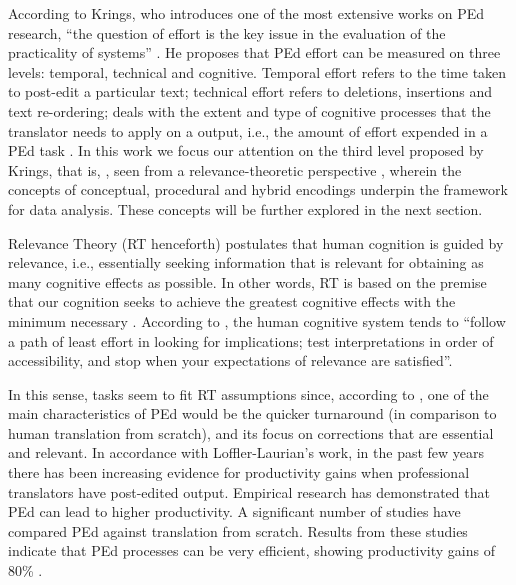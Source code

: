 \documentclass[output=paper]{langsci/langscibook}
\begin{document}
According to Krings, who introduces one of the most extensive works on PEd research, ``the question of  effort is the key issue in the evaluation of the practicality of  systems'' \citep[178]{krings2001}. He proposes that PEd effort can be measured on three levels: temporal, technical and cognitive. Temporal effort refers to the time taken to post-edit a particular text; technical effort refers to deletions, insertions and text re-ordering;  deals with the extent and type of cognitive processes that the translator needs to apply on a  output, i.e., the amount of effort expended in a PEd task \citep{obrien2006}. In this work we focus our attention on the third level proposed by Krings, that is, , seen from a relevance-theoretic perspective \citep{Sperber1986second}, wherein the concepts of conceptual, procedural and hybrid encodings underpin the framework for data analysis. These concepts will be further explored in the next section.



Relevance Theory (RT henceforth) postulates that human cognition is guided by relevance, i.e., essentially seeking information that is relevant for obtaining as many cognitive effects as possible. In other words, RT is based on the premise that our cognition seeks to achieve the greatest cognitive effects with the minimum necessary . According to \citet[72]{Wilson2011}, the human cognitive system tends to ``follow a path of least effort in looking for implications; test interpretations in order of accessibility, and stop when your expectations of relevance are satisfied''. 



In this sense,  tasks seem to fit RT assumptions since, according to \citet{LofflerLaurian1984, LofflerLaurian1996}, one of the main characteristics of PEd would be the quicker turnaround (in comparison to human translation from scratch), and its focus on corrections that are essential and relevant. In accordance with Loffler-Laurian's work, in the past few years there has been increasing evidence for productivity gains when professional translators have post-edited  output. Empirical research has demonstrated that PEd can lead to higher productivity. A significant number of studies have compared PEd against translation from scratch. Results from these studies indicate that PEd processes can be very efficient, showing productivity gains of 80\% \citep{Plitt2010, skadicnvs2011, pouliquen2011, federico2012}. 
\end{document}
